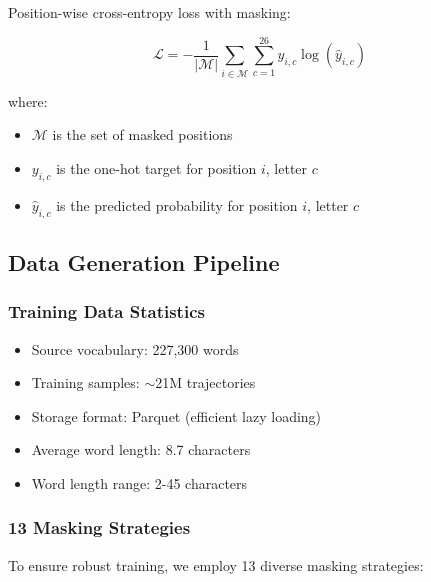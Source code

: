 \documentclass[12pt,a4paper]{article}
\begin{document}
Position-wise cross-entropy loss with masking:

\begin{equation}
\mathcal{L} = -\frac{1}{|\mathcal{M}|} \sum_{i \in \mathcal{M}} \sum_{c=1}^{26} y_{i,c} \log(\hat{y}_{i,c})
\end{equation}

where:
\begin{itemize}
    \item $\mathcal{M}$ is the set of masked positions
    \item $y_{i,c}$ is the one-hot target for position $i$, letter $c$
    \item $\hat{y}_{i,c}$ is the predicted probability for position $i$, letter $c$
\end{itemize}

\subsection{Data Generation Pipeline}

\subsubsection{Training Data Statistics}
\begin{itemize}
    \item Source vocabulary: 227,300 words
    \item Training samples: $\sim$21M trajectories
    \item Storage format: Parquet (efficient lazy loading)
    \item Average word length: 8.7 characters
    \item Word length range: 2-45 characters
\end{itemize}

\subsubsection{13 Masking Strategies}

To ensure robust training, we employ 13 diverse masking strategies:
\end{document}
